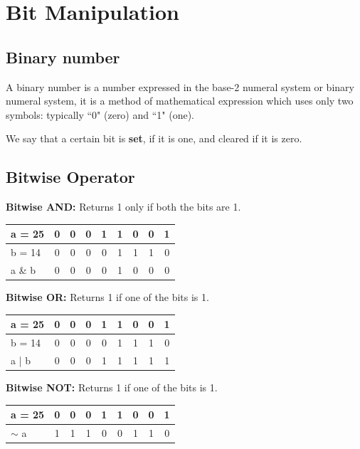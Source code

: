 \documentclass{report}
\begin{document}
\tableofcontents

\chapter{Bit Manipulation}

\section{Binary number}
A binary number is a number expressed in the base-2 numeral system or binary numeral system, it is a method of mathematical expression which uses only two symbols: typically ``0" (zero) and ``1" (one).

We say that a certain bit is \textbf{set}, if it is one, and cleared if it is zero.

\section{Bitwise Operator}

\vspace{3ex}
\textbf{\large{Bitwise AND}: }
Returns 1 only if both the bits are 1.

\begin{tabularx}{9cm}{|P{1cm}|C|C|C|C|C|C|C|C|}\hline
   a = 25 &
   0 & 0 & 0 & 1 & 1 & 0 & 0 & 1\\\hline
   b = 14 &
   0 & 0 & 0 & 0 & 1 & 1 & 1 & 0\\\hline
   a \& b &
   0 & 0 & 0 & 0 & 1 & 0 & 0 & 0\\\hline
\end{tabularx}

\vspace{3ex}
\textbf{\large{Bitwise OR}: }
Returns 1 if one of the bits is 1.

\begin{tabularx}{9cm}{|P{1.5cm}|C|C|C|C|C|C|C|C|}\hline
   a = 25 &
   0 & 0 & 0 & 1 & 1 & 0 & 0 & 1\\\hline
   b = 14 &
   0 & 0 & 0 & 0 & 1 & 1 & 1 & 0\\\hline
   a | b &
   0 & 0 & 0 & 1 & 1 & 1 & 1 & 1\\\hline
\end{tabularx}

\vspace{3ex}
\textbf{\large{Bitwise NOT}: }
Returns 1 if one of the bits is 1.

\begin{tabularx}{9cm}{|P{1.5cm}|C|C|C|C|C|C|C|C|}\hline
   a = 25 &
   0 & 0 & 0 & 1 & 1 & 0 & 0 & 1\\\hline
   $\sim$ a &
   1 & 1 & 1 & 0 & 0 & 1 & 1 & 0\\\hline
\end{tabularx}
\end{document}
